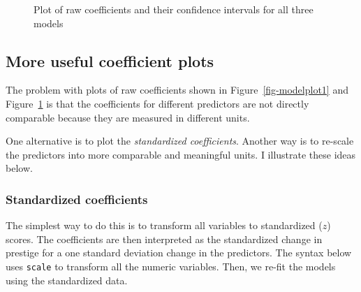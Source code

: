 \documentclass[
  letterpaper,
  10pt,
  krantz2]{krantz}
\begin{document}
\begin{figure}[H]


\caption{\label{fig-modelplot2}Plot of raw coefficients and their
confidence intervals for all three models}

\end{figure}%

\subsection{More useful coefficient
plots}\label{more-useful-coefficient-plots}

The problem with plots of raw coefficients shown in
Figure~\ref{fig-modelplot1} and Figure~\ref{fig-modelplot2} is that the
coefficients for different predictors are not directly comparable
because they are measured in different units.

One alternative is to plot the \emph{standardized coefficients}. Another
way is to re-scale the predictors into more comparable and meaningful
units. I illustrate these ideas below.

\subsubsection*{Standardized
coefficients}\label{standardized-coefficients}

The simplest way to do this is to transform all variables to
standardized (\(z\)) scores. The coefficients are then interpreted as
the standardized change in prestige for a one standard deviation change
in the predictors. The syntax below uses \texttt{scale} to transform all
the numeric variables. Then, we re-fit the models using the standardized
data.
\end{document}

